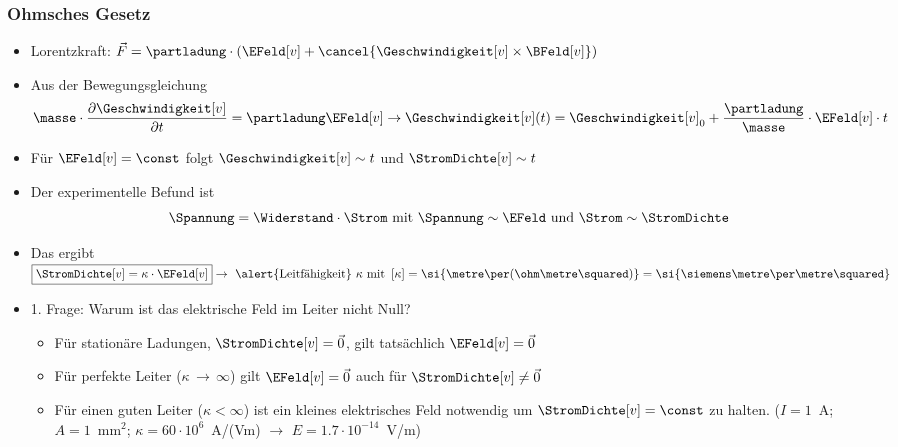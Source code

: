 \begin{frame}
  \frametitle{Ohmsches Gesetz}
\begin{itemize}[<+->]      
\item Lorentzkraft: $\vec{F} = \partladung \cdot \left( \EFeld[v] + \cancel{\Geschwindigkeit[v] \times \BFeld[v]} \right)$
\item Aus der Bewegungsgleichung
\begin{equation*}
	\masse \cdot \dfrac{\partial \Geschwindigkeit[v]}{\partial t} = \partladung \EFeld[v] \to \Geschwindigkeit[v](t) = \Geschwindigkeit[v]_0 + \dfrac{\partladung}{\masse} \cdot \EFeld[v] \cdot t
\end{equation*}
\item Für \(\EFeld[v] = \const \) folgt \(\Geschwindigkeit[v] \sim t\) und \(\StromDichte[v] \sim t \)
\item Der experimentelle Befund ist
\begin{equation*}
	\Spannung = \Widerstand \cdot \Strom \text{ mit } \Spannung \sim \EFeld \text{ und } \Strom \sim \StromDichte
\end{equation*}
\item Das ergibt
$
	\boxed{\StromDichte[v] = \kappa \cdot \EFeld[v]}  \to \text{ \alert{Leitfähigkeit} }\kappa \text{ mit } \left[\kappa \right] = \si{\metre\per(\ohm\metre\squared)} = \si{\siemens\metre\per\metre\squared} 
$
\item 1. Frage: Warum ist das elektrische Feld im Leiter nicht
  Null?
  \begin{itemize}
  \item Für stationäre Ladungen, $\StromDichte[v] = \vec{0}$, gilt tatsächlich \(\EFeld[v] = \vec{0} \)
  \item Für perfekte Leiter (\(\kappa \,\rightarrow\, \infty \)) gilt \(\EFeld[v] = \vec{0} \) auch für  $\StromDichte[v] \ne \vec{0}$
   \item Für einen guten Leiter (\(\kappa < \infty \)) ist ein kleines elektrisches Feld notwendig um \(\StromDichte[v] = \const \) zu halten. ($I=1$~A; $A=1$~mm$^2$; $\kappa=60\cdot 10^6$~A/(Vm) $\to$ $E=1.7 \cdot 10^{-14}$~V/m)
    \end{itemize} 
\end{itemize}
\end{frame}

